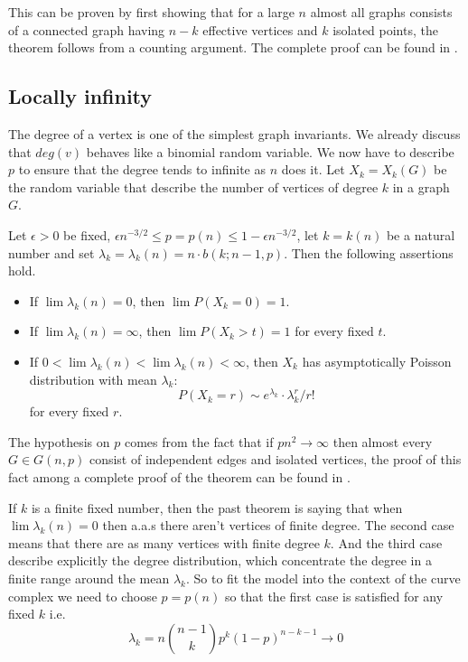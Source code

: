  This can be proven by first showing that for a large $n$ almost all graphs consists of a connected graph having $n-k$ effective vertices and $k$ isolated points, the theorem follows from a counting argument. The complete proof can be found in \cite[Erdös-Rényi, 59]{OnRandomGraphs}.
 
\subsection{Locally infinity}
The degree of a vertex is one of the simplest graph invariants. We already discuss that $deg(v)$ behaves like a binomial random variable. We now have to describe $p$ to ensure that the degree tends to infinite as $n$ does it. Let $X_{k} = X_{k} (G)$ be the random variable that describe the number of vertices of degree $k$ in a graph $G$.

\begin{theorem}
Let $\epsilon>0$ be fixed, $\epsilon n^{-3/2} \leq p = p(n) \leq 1 - \epsilon n^{-3/2}$, let $k = k(n)$ be a natural number and set $\lambda_{k} = \lambda_{k}(n) = n\cdot b(k;n - 1,p)$. Then the following assertions hold.

\begin{itemize}
\item If $\lim \lambda_{k}(n) = 0$, then $\lim P(X_{k} = 0) = 1$. 
\item If $\lim \lambda_{k}(n) = \infty$, then $\lim P(X_{k} > t) = 1$
for every fixed $t$.
\item If $0 < \lim\lambda_{k}(n) < \lim \lambda_{k}(n) < \infty$,
then $X_{k}$ has asymptotically Poisson distribution with mean $\lambda_{k}$: 
$$P(X_{k} = r) \sim e^{\lambda_{k}}\cdot \lambda_{k}^{r}/ r!$$
for every fixed $r$.
\end{itemize}
\end{theorem}

The hypothesis on $p$ comes from the fact that if $pn^{2}\to \infty$ then almost every $G\in G(n,p)$ consist of independent edges and isolated vertices, the proof of this fact among a complete proof of the theorem can be found in \cite[Bollobás, p.61]{Bollobas}.

If $k$ is a finite fixed number, then the past theorem is saying that when $\lim \lambda_{k}(n) = 0$ then a.a.s there aren't vertices of finite degree. The second case means that there are as many vertices with finite degree $k$. And the third case describe explicitly the degree distribution, which concentrate the degree in a finite range around the mean $\lambda_{k}$. So to fit the model into the context of the curve complex we need to choose $p = p(n)$ so that the first case is satisfied for any fixed $k$ i.e.
$$\lambda_{k} = n \binom{n-1}{k} p^{k} (1-p)^{n-k-1} \to 0$$


